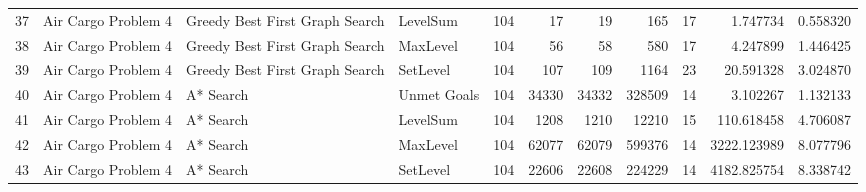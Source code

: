 \begin{tabular}{llllrrrrrrr}
37 &  Air Cargo Problem 4 &  Greedy Best First Graph Search &     LevelSum &      104 &          17 &          19 &        165 &           17 &     1.747734 &    0.558320 \\
38 &  Air Cargo Problem 4 &  Greedy Best First Graph Search &     MaxLevel &      104 &          56 &          58 &        580 &           17 &     4.247899 &    1.446425 \\
39 &  Air Cargo Problem 4 &  Greedy Best First Graph Search &     SetLevel &      104 &         107 &         109 &       1164 &           23 &    20.591328 &    3.024870 \\
40 &  Air Cargo Problem 4 &                       A* Search &  Unmet Goals &      104 &       34330 &       34332 &     328509 &           14 &     3.102267 &    1.132133 \\
41 &  Air Cargo Problem 4 &                       A* Search &     LevelSum &      104 &        1208 &        1210 &      12210 &           15 &   110.618458 &    4.706087 \\
42 &  Air Cargo Problem 4 &                       A* Search &     MaxLevel &      104 &       62077 &       62079 &     599376 &           14 &  3222.123989 &    8.077796 \\
43 &  Air Cargo Problem 4 &                       A* Search &     SetLevel &      104 &       22606 &       22608 &     224229 &           14 &  4182.825754 &    8.338742 \\
\bottomrule
\end{tabular}
